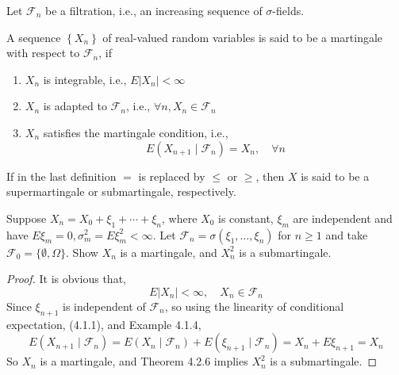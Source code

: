 Let $\mathcal{F}_{n}$ be a filtration, i.e., an increasing sequence of $\sigma$-fields.
\begin{definition}[Martingale]
	A sequence $\left\{X_{n}\right\}$ of real-valued random variables  is said to be a martingale with respect to $\mathcal{F}_{n}$, if
	\begin{enumerate}
		\item $X_{n}$ is integrable, i.e., $E\left|X_{n}\right|<\infty$
		\item $X_{n}$ is adapted to $\mathcal{F}_{n}$, i.e., $\forall n,X_{n}\in \mathcal{F}_{n}$
		\item $X_{n}$ satisfies the martingale condition, i.e.,
		      \begin{equation}
			      E\left(X_{n+1}\mid\mathcal{F}_{n}\right)=X_{n},\quad\forall n
		      \end{equation}
	\end{enumerate}
\end{definition}

\begin{remark}
	If in the last definition $=$ is replaced by $\leq$ or $\geq$, then $X$ is said to be a supermartingale or submartingale, respectively.
\end{remark}

\begin{example}

\end{example}

\begin{example}

\end{example}

\begin{example}

\end{example}

\begin{example}
	Suppose $X_{n}=X_{0}+\xi_{1}+\cdots+\xi_{n}$, where $X_{0}$ is constant, $\xi_{m}$ are independent and have $E\xi_{m}=0,\sigma_{m}^{2}=E\xi_{m}^{2}<\infty$. Let $\mathcal{F}_{n}=\sigma\left(\xi_{1},\ldots,\xi_{n}\right)$ for $n\geq 1$ and take $\mathcal{F}_{0}=\{\emptyset, \Omega\}$. Show $X_{n}$ is a martingale, and $X_{n}^{2}$ is a submartingale.
\end{example}

\begin{proof}
	It is obvious that,
	\begin{equation*}
		E\left|X_{n}\right|<\infty,\quad X_{n}\in\mathcal{F}_{n}
	\end{equation*}
	Since $\xi_{n+1}$ is independent of $\mathcal{F}_{n}$, so using the linearity of conditional expectation, (4.1.1), and Example 4.1.4,
	\begin{equation*}
		E\left(X_{n+1}\mid\mathcal{F}_{n}\right)=E\left(X_{n}\mid\mathcal{F}_{n}\right)+E\left(\xi_{n+1}\mid\mathcal{F}_{n}\right)=X_{n}+E\xi_{n+1}=X_{n}
	\end{equation*}
	So $X_{n}$ is a martingale, and Theorem 4.2.6 implies $X_{n}^{2}$ is a submartingale.
\end{proof}

